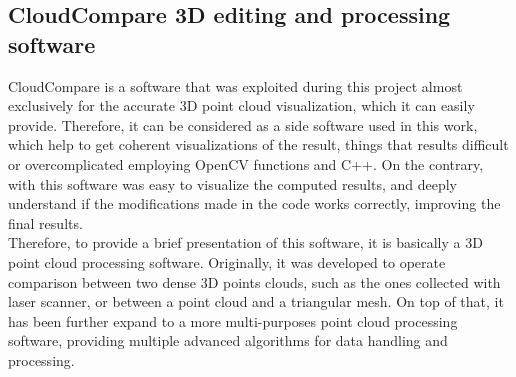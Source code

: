 \subsection{CloudCompare 3D editing and processing software}
\label{subsection:cloud-compare-env}

CloudCompare is a software that was exploited during this project almost exclusively for the accurate 3D point cloud visualization, which it can easily provide.
Therefore, it can be considered as a side software used in this work, which help to get coherent visualizations of the result, things that results difficult or overcomplicated employing OpenCV functions and C++. 
On the contrary, with this software was easy to visualize the computed results, and deeply understand if the modifications made in the code works correctly, improving the final results.\\
Therefore, to provide a brief presentation of this software, it is basically a 3D point cloud processing software.
Originally, it was developed to operate comparison between two dense 3D points clouds, such as the ones collected with laser scanner, or between a point cloud and a triangular mesh.
On top of that, it has been further expand to a more multi-purposes point cloud processing software, providing multiple advanced algorithms for data handling and processing. 



 
